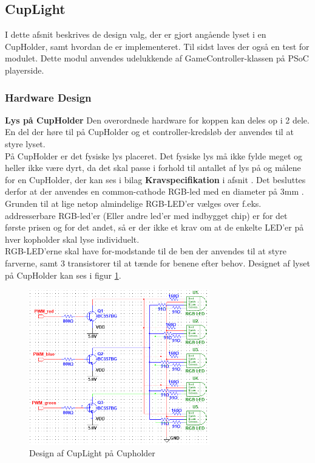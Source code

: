 \documentclass[Rapport/Rapport_main.tex]{subfiles}
\begin{document}
\subsection{CupLight}\label{sec:rap_cup_light}
I dette afsnit beskrives de design valg, der er gjort angående lyset i en CupHolder, samt hvordan de er implementeret. Til sidst laves der også en test for modulet. Dette modul anvendes udelukkende af GameController-klassen på PSoC playerside.
\subsubsection{Hardware Design}
\textbf{Lys på CupHolder}
Den overordnede hardware for koppen kan deles op i 2 dele. En del der høre til på CupHolder og et controller-kredsløb der anvendes til at styre lyset.\\
På CupHolder er det fysiske lys placeret. Det fysiske lys må ikke fylde meget og heller ikke være dyrt, da det skal passe i forhold til antallet af lys på og målene for en CupHolder, der kan ses i bilag \textbf{Kravspecifikation} i afsnit . Det besluttes derfor at der anvendes en common-cathode RGB-led med en diameter på 3mm \cite{RGBledDatasheet}. Grunden til at lige netop almindelige RGB-LED'er vælges over f.eks. addresserbare RGB-led'er (Eller andre led'er med indbygget chip) er for det første prisen og for det andet, så er der ikke et krav om at de enkelte LED'er på hver kopholder skal lyse individuelt.\\
RGB-LED'erne skal have for-modstande til de ben der anvendes til at styre farverne, samt 3 transistorer\cite{datasheet_bc557b} til at tænde for benene efter behov. Designet af lyset på CupHolder kan ses i figur \ref{fig:rap_cupholder_light}.
\begin{figure}[H]
    \centering
    \includegraphics[width=0.7\textwidth]{HardwareDesign/CupLight/graphics/CupHolder_HW.png}
    \caption{Design af CupLight på Cupholder}
    \label{fig:rap_cupholder_light}
\end{figure}
\end{document}
